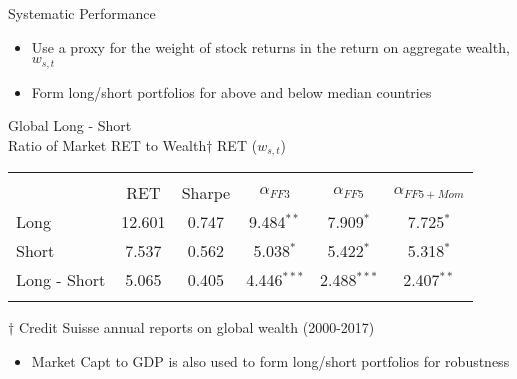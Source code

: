 \documentclass{beamer}
\begin{document}
\begin{frame}{Systematic Performance}
	\begin{itemize}[<+->]
		\item Use a proxy for the weight of stock returns in the return on aggregate wealth, $w_{s,t}$
		\item Form long/short portfolios for above and below median countries
	\end{itemize}
	\begin{center}
	Global Long - Short\\
	Ratio of Market RET to Wealth$\dagger$ RET ($w_{s,t}$)
	\end{center}
	\vspace{-6pt}
	\begin{adjustbox}{width=\textwidth}
		\begin{tabular}{lccccc}
			\hline\\[-1.8ex]
			& RET & Sharpe & $\alpha_{FF3}$ & $\alpha_{FF5}$ & $\alpha_{FF5+Mom}$ \\
			\cline{2-6}
			Long & 12.601 & 0.747 & 9.484$^{**}$ & 7.909$^{*}$ & 7.725$^{*}$ \\
			Short & 7.537 & 0.562 & 5.038$^{*}$ & 5.422$^{*}$ & 5.318$^{*}$ \\
			Long - Short & 5.065 & 0.405 & 4.446$^{***}$ & 2.488$^{***}$ & 2.407$^{**}$ \\
			\hline\\[-1.8ex]
		\end{tabular}
	\end{adjustbox}
	$\dagger$ Credit Suisse annual reports on global wealth (2000-2017)
		\begin{itemize}
			\item Market Capt to GDP is also used to form long/short portfolios for robustness
		\end{itemize}
\end{frame}
\end{document}
